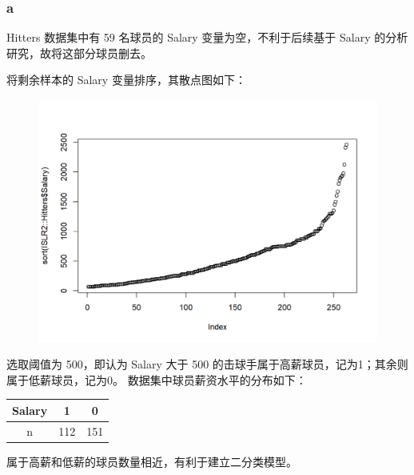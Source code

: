 \documentclass[12pt,a4paper]{article}
\begin{document}
    \subsubsection*{a}
    Hitters 数据集中有 59 名球员的 Salary 变量为空，不利于后续基于 Salary 的分析研究，故将这部分球员删去。\par
    将剩余样本的 Salary 变量排序，其散点图如下：
    \begin{figure}[H]
        \centering
        \includegraphics[scale=0.65]{Salary.png}
    \end{figure}
    选取阈值为 500，即认为 Salary 大于 500 的击球手属于高薪球员，记为1；其余则属于低薪球员，记为0。
    数据集中球员薪资水平的分布如下：
    \begin{longtable}{c|c|c}
        \hline
        Salary & 1 & 0\\
        \hline
        n & 112 & 151\\
        \hline
    \end{longtable}
    属于高薪和低薪的球员数量相近，有利于建立二分类模型。
\end{document}
